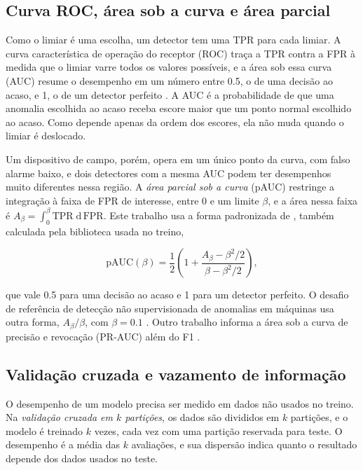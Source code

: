 \subsection{Curva ROC, área sob a curva e área parcial}
\label{sec:fund-roc}

Como o limiar é uma escolha, um detector tem uma TPR para cada limiar. A curva característica de operação do receptor (ROC) traça a TPR contra a FPR à medida que o limiar varre todos os
valores possíveis, e a área sob essa curva (AUC) resume o desempenho em um número entre \num{0,5}, o de uma decisão ao acaso, e 1, o de um detector perfeito \cite{fawcett2006}. A AUC é a
probabilidade de que uma anomalia escolhida ao acaso receba escore maior que um ponto normal escolhido ao acaso. Como depende apenas da ordem dos escores, ela não muda quando o limiar é
deslocado.

Um dispositivo de campo, porém, opera em um único ponto da curva, com falso alarme baixo, e dois detectores com a mesma AUC podem ter desempenhos muito diferentes nessa região. A
\emph{área parcial sob a curva} (pAUC) restringe a integração à faixa de FPR de interesse, entre 0 e um limite $\beta$, e a área nessa faixa é
$A_\beta = \int_{0}^{\beta} \mathrm{TPR}\; \mathrm{d}\,\mathrm{FPR}$. Este trabalho usa a forma padronizada de , também calculada pela biblioteca usada no treino,

\begin{equation}
\mathrm{pAUC}(\beta) = \frac{1}{2}\left(1 + \frac{A_\beta - \beta^2/2}{\beta - \beta^2/2}\right),
\label{eq:fund-pauc}
\end{equation}

\noindent
que vale \num{0,5} para uma decisão ao acaso e 1 para um detector perfeito. O desafio de referência de detecção não supervisionada de anomalias em máquinas usa outra forma, $A_\beta/\beta$, com
$\beta = \num{0,1}$ \cite{koizumi2020}. Outro trabalho informa a área sob a curva de precisão e revocação (PR-AUC) além do F1 \cite{brito2022}.

\subsection{Validação cruzada e vazamento de informação}
\label{sec:fund-validacao}

O desempenho de um modelo precisa ser medido em dados não usados no treino. Na \emph{validação cruzada em $k$ partições}, os dados são divididos em $k$ partições, e o modelo é treinado $k$ vezes,
cada vez com uma partição reservada para teste. O desempenho é a média das $k$ avaliações, e sua dispersão indica quanto o resultado depende dos dados usados no teste.

